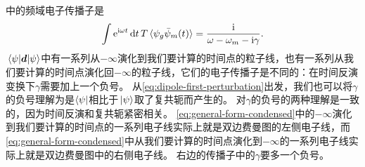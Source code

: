 中的频域电子传播子是
\[
    \int \mathrm{e}^{\mathrm{i} \omega t} \dd{t} T\expval*{{\psi}_g \bar{\psi}_m(t)} = \frac{\mathrm{i}}{\omega - \omega_m - \mathrm{i} \gamma}.
\]
$\mel{\psi}{\vb*{d}}{\psi}$中有一系列从$-\infty$演化到我们要计算的时间点的粒子线，也有一系列从我们要计算的时间点演化回$-\infty$的粒子线，它们的电子传播子是不同的：在时间反演变换下$\gamma$需要加上一个负号。
从\eqref{eq:dipole-first-perturbation}出发，我们也可以将$\gamma$的负号理解为是$\bra{\psi}$相比于$\ket*{\psi}$取了复共轭而产生的。
对$\gamma$的负号的两种理解是一致的，因为时间反演和复共轭紧密相关。
\eqref{eq:general-form-condensed}中的$-\infty$演化到我们要计算的时间点的一系列电子线实际上就是双边费曼图的左侧电子线，而\eqref{eq:general-form-condensed}中从我们要计算的时间点演化到$-\infty$的一系列电子线实际上就是双边费曼图中的右侧电子线。
右边的传播子中的$\gamma$要多一个负号。

